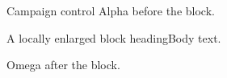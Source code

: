 \documentclass[11pt,aspectratio=169]{beamer}
\date{}
\begin{document}
\begin{frame}{Campaign control}
Alpha before the block.
\begin{block}{A locally enlarged block heading}Body text.\end{block}
Omega after the block.
\end{frame}
\end{document}
